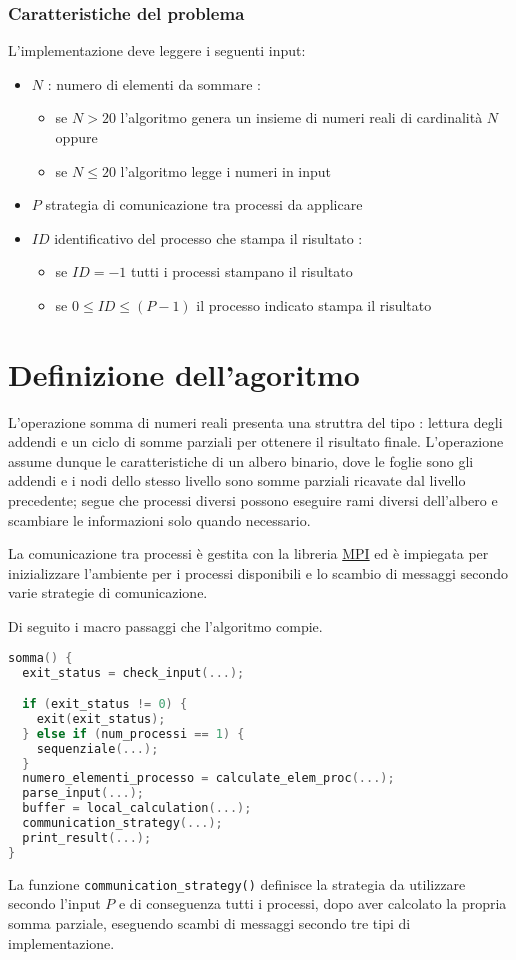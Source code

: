 \documentclass[a4paper,11pt]{book}
\begin{document}
\subsection{Caratteristiche del problema}\label{caratteritiche_problema}
L'implementazione deve leggere i seguenti input:
\begin{itemize}
    \item $N$ : numero di elementi da sommare :
    \begin{itemize}
        \item se $N > 20$ l'algoritmo genera un insieme di numeri reali di cardinalità $N$ oppure
        \item se $N \leq 20$ l'algoritmo legge i numeri in input
    \end{itemize}
    \item $P$ strategia di comunicazione tra processi da applicare
    \item $ID$ identificativo del processo che stampa il risultato :
    \begin{itemize}
        \item se $ID = -1$ tutti i processi stampano il risultato
        \item se $0 \leq ID \leq (P - 1)$ il processo indicato stampa il risultato
    \end{itemize} 
\end{itemize}
\chapter{Definizione dell'agoritmo}
L'operazione somma di numeri reali presenta una struttra del tipo : lettura degli addendi e un ciclo di somme parziali per ottenere il risultato finale. L'operazione assume dunque le caratteristiche di un albero binario, dove le foglie sono gli addendi e i nodi dello stesso livello sono somme parziali ricavate dal livello precedente; segue che processi diversi possono eseguire rami diversi dell'albero e scambiare le informazioni solo quando necessario. \par 
La comunicazione tra processi è gestita con la libreria \underline{MPI} ed è impiegata per inizializzare l'ambiente per i processi disponibili e lo scambio di messaggi secondo varie strategie di comunicazione. \par 
Di seguito i macro passaggi che l'algoritmo compie.
 \begin{lstlisting}[language=C]
somma() {
  exit_status = check_input(...);

  if (exit_status != 0) {
    exit(exit_status);
  } else if (num_processi == 1) {
    sequenziale(...);
  }
  numero_elementi_processo = calculate_elem_proc(...);
  parse_input(...);
  buffer = local_calculation(...);
  communication_strategy(...);
  print_result(...);
}
\end{lstlisting}
La funzione \verb|communication_strategy()| definisce la strategia da utilizzare secondo l'input $P$ e di conseguenza tutti i processi, dopo aver calcolato la propria somma parziale, eseguendo scambi di messaggi secondo tre tipi di implementazione.
\end{document}
